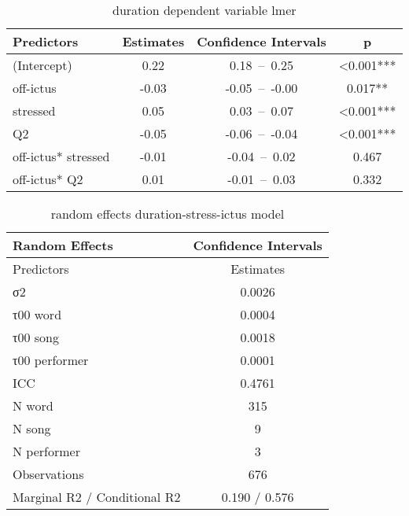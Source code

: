 \begin{table}[htp]
\caption{duration dependent variable lmer}
\begin{center}
\begin{tabular}{|l|c|c|c|}
\hline
Predictors	&	Estimates	&	Confidence Intervals	&	p	\\
\hline
(Intercept)	&	0.22	&	0.18 – 0.25	&	<0.001***	\\
off-ictus	&	-0.03	&	-0.05 – -0.00	&	0.017**	\\
stressed	&	0.05	&	0.03 – 0.07	&	<0.001***	\\
Q2&	-0.05	&	-0.06 – -0.04	&	<0.001***	\\
off-ictus* stressed	&	-0.01	&	-0.04 – 0.02	&	0.467	\\
off-ictus* Q2	&	0.01	&	-0.01 – 0.03	&	0.332	\\
\hline
\end{tabular}
\end{center}
\label{durlmer}
\end{table}%

\begin{table}[htp]
\caption{random effects duration-stress-ictus model}
\begin{center}
\begin{tabular}{|l|c|}
\hline

{\bf Random Effects }	&	Confidence Intervals	\\
\hline
Predictors & Estimates \\
σ2	&	0.0026		\\
τ00 word	&	0.0004		\\
τ00 song	&	0.0018			\\
τ00 performer	&	0.0001		\\
ICC	&	0.4761		\\
\hline
N word	&	315			\\
N song	&	9			\\
N performer	&	3		\\
Observations	&	676		\\
Marginal R2 / Conditional R2	&	0.190 / 0.576	\\
\hline
\end{tabular}
\end{center}
\label{durlmerrando}
\end{table}%




